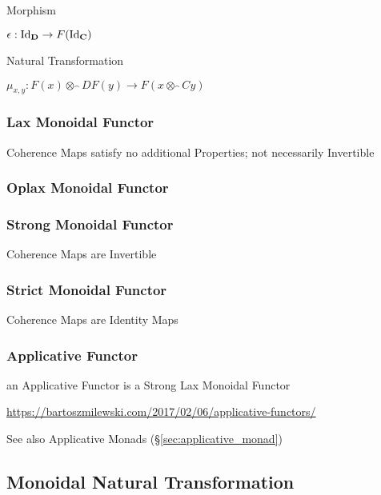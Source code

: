 Morphism

$\epsilon : \mathrm{Id}_\mathbf{D} \rightarrow F(\mathrm{Id}_\mathbf{C})$

Natural Transformation

$\mu_{x,y} : F(x) \otimes_\cat{D} F(y) \rightarrow F(x \otimes_\cat{C}
y)$



\subsubsection{Lax Monoidal Functor}\label{sec:lax_monoidal_functor}

Coherence Maps satisfy no additional Properties; not necessarily
Invertible



\subsubsection{Oplax Monoidal Functor}\label{sec:oplax_monoidal_functor}

\subsubsection{Strong Monoidal Functor}\label{sec:strong_monoidal_functor}

Coherence Maps are Invertible



\subsubsection{Strict Monoidal Functor}\label{sec:strict_monoidal_functor}

Coherence Maps are Identity Maps



\subsubsection{Applicative Functor}\label{sec:applicative_functor}

an Applicative Functor is a Strong Lax Monoidal Functor

\url{https://bartoszmilewski.com/2017/02/06/applicative-functors/}

\fist See also Applicative Monads (\S\ref{sec:applicative_monad})



\subsection{Monoidal Natural Transformation}
\label{sec:monoidal_natural_transformation}

